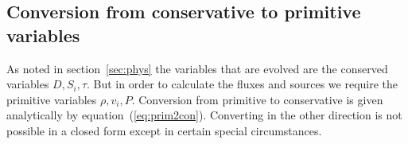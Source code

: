 \documentclass{article}
\begin{document}
%


\subsection{Conversion from conservative to primitive variables}
\label{sec:con2prim}

As noted in section~\ref{sec:phys} the variables that are evolved are
the conserved variables $D, S_i, \tau$. But in order to calculate the
fluxes and sources we require the primitive variables $\rho, v_i, P$.
Conversion from primitive to conservative is given analytically by
equation~(\ref{eq:prim2con}). Converting in the other direction is not
possible in a closed form except in certain special circumstances.
\end{document}
